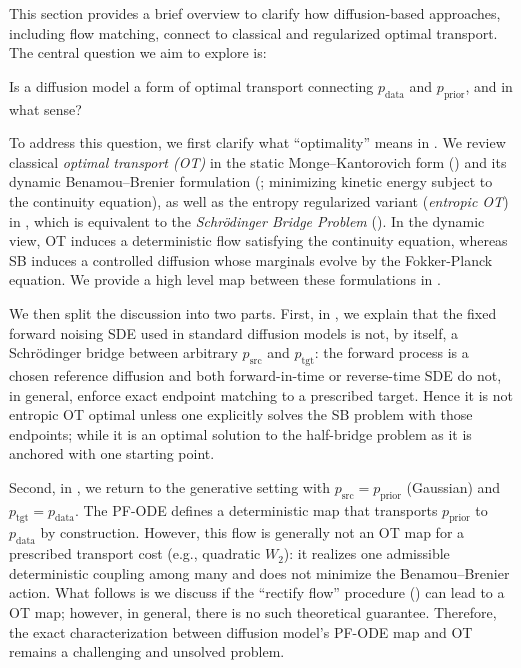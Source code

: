 This section provides a brief overview to clarify how diffusion-based approaches, including flow matching, connect to classical and regularized optimal transport. The central question we aim to explore is:
\begin{question}
    Is a diffusion model a form of optimal transport connecting $p_{\text{data}}$ and $p_{\text{prior}}$, and in what sense?
\end{question}


To address this question, we first clarify what ``optimality'' means in
. We review classical \emph{optimal transport (OT)} in the static
Monge--Kantorovich form () and its dynamic Benamou--Brenier formulation (; minimizing
kinetic energy subject to the continuity equation), as well as the entropy
regularized variant (\emph{entropic OT}) in , which is equivalent to the \emph{Schr\"odinger
Bridge Problem} (). In the dynamic view, OT induces a deterministic flow
satisfying the continuity equation, whereas SB induces a controlled diffusion
whose marginals evolve by the Fokker-Planck equation. We provide a high level
map between these formulations in .

We then split the discussion into two parts. First, in , we
explain that the fixed forward noising SDE used in standard diffusion models is
not, by itself, a Schr\"odinger bridge between arbitrary $p_{\mathrm{src}}$ and
$p_{\mathrm{tgt}}$: the forward process is a chosen reference diffusion and both forward-in-time or reverse-time SDE do not, in general, enforce exact endpoint matching to a prescribed target. Hence
it is not entropic OT optimal unless  one explicitly solves the SB problem with those
endpoints; while it is an optimal solution to the half-bridge problem as it is anchored with one starting point.

Second, in , we return to the generative setting with
$p_{\mathrm{src}}=p_{\mathrm{prior}}$ (Gaussian) and
$p_{\mathrm{tgt}}=p_{\mathrm{data}}$. The PF-ODE  defines a deterministic map that transports
$p_{\mathrm{prior}}$ to $p_{\mathrm{data}}$ by construction. However, this flow is generally not an OT map for a prescribed transport cost (e.g., quadratic $W_2$): it realizes one admissible deterministic coupling among many and does not minimize the Benamou–Brenier action. What follows is we discuss if the ``rectify flow'' procedure  () can lead to a OT map; however, in general, there is no such theoretical guarantee. Therefore, the exact characterization between diffusion model's PF-ODE map and OT remains a challenging and unsolved problem.


